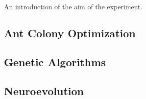 An introduction of the aim of the experiment.

\subsection{Ant Colony Optimization}

\subsection{Genetic Algorithms}

\subsection{Neuroevolution}



